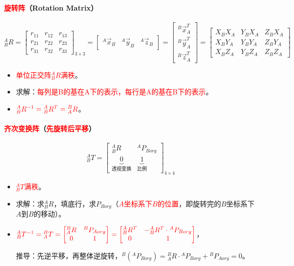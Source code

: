 \documentclass[
12pt, %
a4paper, 
oneside, %
]{scrartcl}
\begin{document}
\paragraph{\textcolor{red}{旋转阵}（Rotation Matrix）}
$$ 
{}^A_B R 
= \begin{bmatrix} r_{11} & r_{12} & r_{13} \\ r_{21} & r_{22} & r_{23} \\ r_{31} & r_{32} & r_{33} \end{bmatrix}_{3 \times 3}
= \begin{bmatrix} {}^A \vec{x}_B & {}^A \vec{y}_B & {}^A \vec{z}_B \end{bmatrix}
= \begin{bmatrix} {}^B \vec{x}_A^T \\ {}^B \vec{y}_A^T \\ {}^B \vec{z}_A^T \end{bmatrix}
= \begin{bmatrix} X_B X_A & Y_B X_A & Z_B X_A \\ X_B Y_A & Y_B Y_A & Z_B Y_A \\ X_B Z_A & Y_B Z_A & Z_B Z_A \end{bmatrix}
$$
\begin{itemize}
\item \textcolor{red}{单位正交阵$ {}^A_B R $满秩}。
\item 求解：\textcolor{red}{每列是B的基在A下的表示，每行是A的基在B下的表示}。
\item $ \textcolor{red}{{}^A_B R^{-1} = {}^A_B R^T = {}^B_A R} $。
\end{itemize}
\paragraph{\textcolor{red}{齐次变换阵}（\textcolor{red}{先旋转后平移}）}
$$ {}^A_B T = \begin{bmatrix} {}^A_B R & {}^A P_{Borg} \\ \underbrace{0}_{\text{透视变换}} & \underbrace{1}_{\text{比例}} \end{bmatrix}_{4 \times 4} $$
\begin{itemize}
\item \textcolor{red}{$ {}^A_B T $满秩}。
\item 求解：求$ {}^A_B R $，填底行，求$ P_{Borg} $（\textcolor{red}{$ A $坐标系下$ B $的位置}，即旋转完的$ B $坐标系下$ A $到$ B $的移动）。
\item $ \textcolor{red}{{}^A_B T^{-1} = {}^B_A T = \begin{bmatrix} {}^B_A R & {}^B P_{Aorg} \\ 0 & 1 \end{bmatrix} = \begin{bmatrix} {}^A_B R^T & -{}^A_B R^T \cdot {}^A P_{Borg} \\ 0 & 1 \end{bmatrix}} $，

推导：先逆平移，再整体逆旋转，$ {}^B({}^A P_{Borg}) = {}^B_A R \cdot {}^A P_{Borg} + {}^B P_{Aorg} = 0 $。
\end{itemize}
\end{document}
